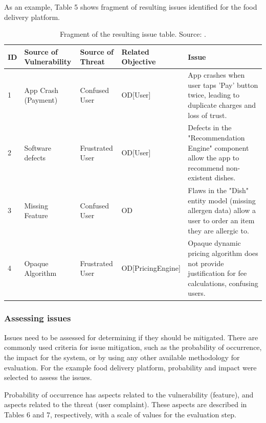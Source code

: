 \documentclass[preprint,10pt]{elsarticle}
\begin{document}
As an example, Table 5 shows fragment of resulting issues identified for the food delivery platform.

\begin{table}[h!]
    \caption{Fragment of the resulting issue table. Source: .}
    \label{tab:5}
    \centering
    \begin{tabularx}{\textwidth}{l X l l X}
        \toprule
        \textbf{ID} & \textbf{Source of Vulnerability} & \textbf{Source of Threat} & \textbf{Related Objective} & \textbf{Issue} \\
        \midrule
        1 & App Crash (Payment) & Confused User & OD[User] & App crashes when user taps 'Pay' button twice, leading to duplicate charges and loss of trust. \\
        2 & Software defects & Frustrated User & OD[User] & Defects in the "Recommendation Engine" component allow the app to recommend non-existent dishes. \\
        3 & Missing Feature & Confused User & OD & Flaws in the "Dish" entity model (missing allergen data) allow a user to order an item they are allergic to. \\
        4 & Opaque Algorithm & Frustrated User & OD[PricingEngine] & Opaque dynamic pricing algorithm does not provide justification for fee calculations, confusing users. \\
        \bottomrule
    \end{tabularx}
\end{table}

\subsubsection{Assessing issues}

Issues need to be assessed for determining if they should be mitigated. There are commonly used criteria for issue mitigation, such as the probability of occurrence, the impact for the system, or by using any other available methodology for evaluation. For the example food delivery platform, probability and impact were selected to assess the issues.

Probability of occurrence has aspects related to the vulnerability (feature), and aspects related to the threat (user complaint). These aspects are described in Tables 6 and 7, respectively, with a scale of values for the evaluation step.
\end{document}
